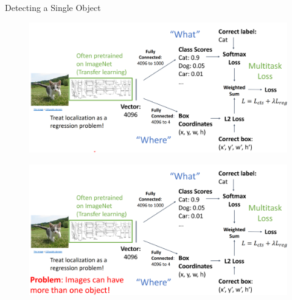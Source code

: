 \documentclass[10pt]{beamer}
\theoremstyle{remark}
\theoremstyle{definition}
\begin{document}
\begin{frame}[allowframebreaks]{Detecting a Single Object}
\framebreak

\begin{figure}
\centering
\includegraphics[width=1.0\textwidth,height=1.0\textheight,keepaspectratio]{./images/object_6.png}
\end{figure}

\framebreak

\begin{figure}
\centering
\includegraphics[width=1.0\textwidth,height=1.0\textheight,keepaspectratio]{./images/object_7.png}
\end{figure}
    
\end{frame}
\end{document}
